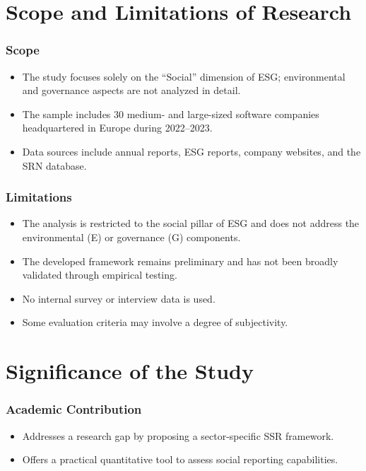 \section{Scope and Limitations of Research}
\subsubsection{Scope}
\begin{itemize}
    \item The study focuses solely on the “Social” dimension of ESG; environmental and governance aspects are not analyzed in detail.
    \item The sample includes 30 medium- and large-sized software companies headquartered in Europe during 2022–2023.
    \item Data sources include annual reports, ESG reports, company websites, and the SRN database.
\end{itemize}

\subsubsection{Limitations}
\begin{itemize}
    \item The analysis is restricted to the social pillar of ESG and does not address the environmental (E) or governance (G) components.
    \item The developed framework remains preliminary and has not been broadly validated through empirical testing.
    \item No internal survey or interview data is used.
    \item Some evaluation criteria may involve a degree of subjectivity.
\end{itemize}

\section{Significance of the Study}
\subsubsection{Academic Contribution}
\begin{itemize}
    \item Addresses a research gap by proposing a sector-specific SSR framework.
    \item Offers a practical quantitative tool to assess social reporting capabilities.
\end{itemize}

